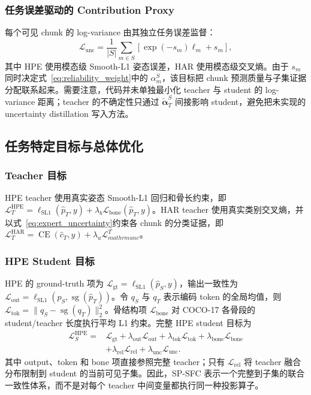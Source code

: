 \documentclass[journal]{IEEEtran}
\begin{document}
\subsubsection{任务误差驱动的 Contribution Proxy}

每个可见 chunk 的 log-variance 由其独立任务误差监督：
\begin{equation}
    \mathcal L_{\mathrm{unc}}
    =\frac{1}{|S|}\sum_{m\in S}
    \left[\exp(-s_m)\ell_m+s_m\right],
    \label{eq:expert_uncertainty}
\end{equation}
其中 HPE 使用模态级 Smooth-L1 姿态误差，HAR 使用模态级交叉熵。由于 $s_m$ 同时决定式~\eqref{eq:reliability_weight}中的 $\alpha_m^S$，该目标把 chunk 预测质量与子集证据分配联系起来。需要注意，代码并未单独最小化 teacher 与 student 的 log-variance 距离；teacher 的不确定性只通过 $\widetilde{\boldsymbol\alpha}_T^S$ 间接影响 student，避免把未实现的 uncertainty distillation 写入方法。

\subsection{任务特定目标与总体优化}

\subsubsection{Teacher 目标}

HPE teacher 使用真实姿态 Smooth-L1 回归和骨长约束，即 $\mathcal L_T^{\mathrm{HPE}}=\ell_{\mathrm{SL1}}(\hat p_T,y)+\lambda_b\mathcal L_{\mathrm{bone}}(\hat p_T,y)$。HAR teacher 使用真实类别交叉熵，并以式~\eqref{eq:expert_uncertainty}约束各 chunk 的分类证据，即 $\mathcal L_T^{\mathrm{HAR}}=\operatorname{CE}(\hat c_T,y)+\lambda_u\mathcal L_{mathrm{unc}}^T$。

\subsubsection{HPE Student 目标}

HPE 的 ground-truth 项为 $\mathcal L_{\mathrm{gt}}=\ell_{\mathrm{SL1}}(\hat p_S,y)$，输出一致性为 $\mathcal L_{\mathrm{out}}=\ell_{\mathrm{SL1}}(\hat p_S,\operatorname{sg}(\hat p_T))$。令 $q_S$ 与 $q_T$ 表示编码 token 的全局均值，则 $\mathcal L_{\mathrm{tok}}=\|q_S-\operatorname{sg}(q_T)\|_2^2$。骨结构项 $\mathcal L_{\mathrm{bone}}$ 对 COCO-17 各骨段的 student/teacher 长度执行平均 L1 约束。完整 HPE student 目标为
\begin{equation}
\begin{aligned}
\mathcal L^{\mathrm{HPE}}_S
=&\mathcal L_{\mathrm{gt}}
+\lambda_{\mathrm{out}}\mathcal L_{\mathrm{out}}
+\lambda_{\mathrm{tok}}\mathcal L_{\mathrm{tok}}
+\lambda_{\mathrm{bone}}\mathcal L_{\mathrm{bone}}\\
&+\lambda_{\mathrm{rel}}\mathcal L_{\mathrm{rel}}
+\lambda_{\mathrm{unc}}\mathcal L_{\mathrm{unc}}.
\end{aligned}
\label{eq:hpe_student_loss}
\end{equation}
其中 output、token 和 bone 项直接参照完整 teacher；只有 $\mathcal L_{\mathrm{rel}}$ 将 teacher 融合分布限制到 student 的当前可见子集。因此，SP-SFC 表示一个完整到子集的联合一致性体系，而不是对每个 teacher 中间变量都执行同一种投影算子。
\end{document}

